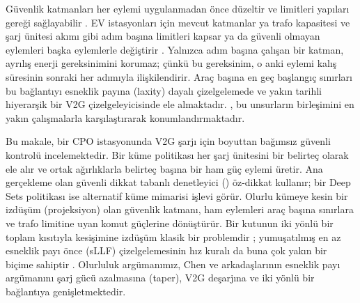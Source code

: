 Güvenlik katmanları her eylemi uygulanmadan önce düzeltir ve limitleri yapıları gereği sağlayabilir \cite{dalal2018safe,chen2021enforcing,tabas2022computationally}.
EV istasyonları için mevcut katmanlar ya trafo kapasitesi ve şarj ünitesi akımı gibi adım başına limitleri kapsar \cite{wan2025logicinformed} ya da güvenli olmayan eylemleri başka eylemlerle değiştirir \cite{guan2024rule,zhang2025dumes}.
Yalnızca adım başına çalışan bir katman, ayrılış enerji gereksinimini korumaz; çünkü bu gereksinim, o anki eylemi kalış süresinin sonraki her adımıyla ilişkilendirir.
Araç başına en geç başlangıç sınırları bu bağlantıyı esneklik payına (laxity) dayalı çizelgelemede \cite{chen2022smoothed} ve yakın tarihli hiyerarşik bir V2G çizelgeleyicisinde \cite{yan2026hierarchical} ele almaktadır.
, bu unsurların birleşimini en yakın çalışmalarla karşılaştırarak konumlandırmaktadır.

Bu makale, bir CPO istasyonunda V2G şarjı için boyuttan bağımsız güvenli kontrolü incelemektedir.
Bir küme politikası her şarj ünitesini bir belirteç olarak ele alır ve ortak ağırlıklarla belirteç başına bir ham güç eylemi üretir.
Ana gerçekleme olan güvenli dikkat tabanlı denetleyici (\method) öz-dikkat kullanır; bir Deep Sets politikası ise alternatif küme mimarisi işlevi görür.
Olurlu kümeye kesin bir izdüşüm (projeksiyon) olan güvenlik katmanı, ham eylemleri araç başına sınırlara ve trafo limitine uyan komut güçlerine dönüştürür.
Bir kutunun iki yönlü bir toplam kısıtıyla kesişimine izdüşüm klasik bir problemdir \cite{kiwiel2007breakpoint,wang2022efficient}; yumuşatılmış en az esneklik payı önce (sLLF) çizelgelemesinin hız kuralı da buna çok yakın bir biçime sahiptir \cite{chen2022smoothed}.
Olurluluk argümanımız, Chen ve arkadaşlarının esneklik payı argümanını şarj gücü azalmasına (taper), V2G deşarjına ve iki yönlü bir bağlantıya genişletmektedir.

